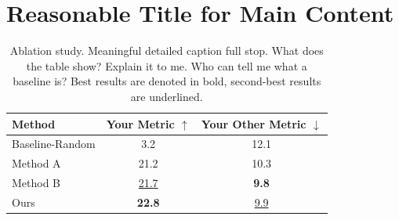 \chapter{Reasonable Title for Main Content}
\label{chap:content}









\begin{table}[!t] %
\centering
\caption{Ablation study. Meaningful detailed caption full stop. What does the table show? Explain it to me. Who can tell me what a baseline is? Best results are denoted in bold, second-best results are underlined.}
\label{tab:label_here}
\begin{tabularx}{\linewidth}{@{}lCC@{}} %
\toprule %
Method & Your Metric $\uparrow$ & Your Other Metric $\downarrow$\\
\midrule %
Baseline-Random & 3.2 & 12.1 \\
Method A \citep{Oetiker2021LatexIntroduction} & 21.2 & 10.3 \\
Method B \citep{Smith2021Wubalubadubdub} & \underline{21.7} & \textbf{9.8}\\
\midrule %
Ours & \textbf{22.8} & \underline{9.9}\\
\bottomrule%
\end{tabularx}
\end{table}

